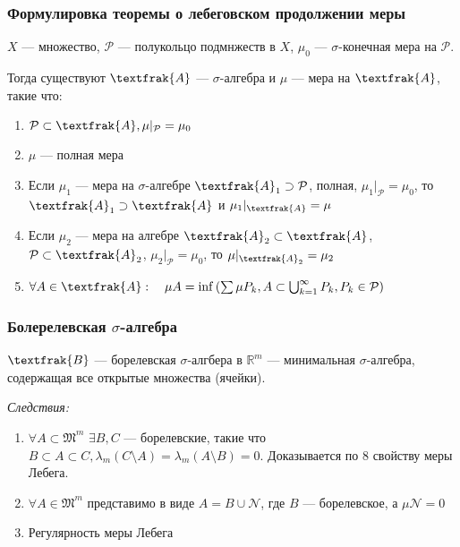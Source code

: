 \documentclass{article}
\def\dbl{\,\,}
\begin{document}
\subsubsection{Формулировка теоремы о лебеговском продолжении меры}

$X$ --- множество, $\mathcal{P}$ --- полукольцо подмнжеств в $X$, $\mu_0$ --- $\sigma$-конечная мера на $\mathcal{P}$.

Тогда существуют $\textfrak{A}$ --- $\sigma$-алгебра и $\mu$ --- мера на $\textfrak{A}$, такие что:

\begin{enumerate}
    \item $\mathcal{P} \subset \textfrak{A}, \mu|_{\mathcal{P}} = \mu_0$
    \item $\mu$ --- полная мера
    \item Если $\mu_1$ --- мера на $\sigma$-алгебре $\textfrak{A}_1 \supset \mathcal{P}$, полная, $\mu_1|_{\mathcal{P}} = \mu_0$, то $\textfrak{A}_1 \supset \textfrak{A}$ и $\mu_1|_{\textfrak{A}} = \mu$
    \item Если $\mu_2$ --- мера на алгебре $\textfrak{A}_2 \subset \textfrak{A}$, $\mathcal{P} \subset \textfrak{A}_2$, $\mu_2|_{\mathcal{P}} = \mu_0$, то $\mu|_{\textfrak{A}_2} = \mu_2$
    \item $\forall A \in \textfrak{A}: \quad \mu A = \inf\left(\sum \mu P_k, A \subset \bigcup_{k = 1}^{\infty} P_k, P_k \in \mathcal{P}\right)$
\end{enumerate}

\subsubsection{Болерелевская $\sigma$-алгебра}

$\textfrak{B}$ --- борелевская $\sigma$-алгбера в $\mathbb{R}^m$ --- минимальная $\sigma$-алгебра, содержащая все открытые множества (ячейки).

\textit{Следствия:}

\begin{enumerate}
    \item $\forall A \subset \mathfrak{M}^m \dbl \exists B, C$ --- борелевские, такие что $B \subset A \subset C, \lambda_m(C \setminus A) = \lambda_m(A \setminus B) = 0$. Доказывается по 8 свойству меры Лебега.
    \item $\forall A \in \mathfrak{M}^m$ представимо в виде $A = B \cup \mathcal{N}$, где $B$ --- борелевское, а $\mu \mathcal{N} = 0$
    \item Регулярность меры Лебега
\end{enumerate}
\end{document}
